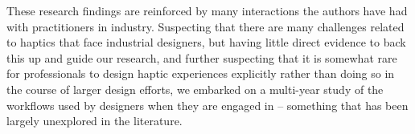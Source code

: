 These research findings are reinforced by many interactions the authors have had with practitioners in industry.
Suspecting that there are many challenges related to haptics that face industrial designers, but having little direct evidence to back this up and guide our research,
and further suspecting that it is somewhat rare for professionals to design haptic experiences explicitly rather than doing so in the course of larger design efforts,
we embarked on a multi-year study of the workflows used by designers when they are engaged in \haxd{} -- something that has been largely unexplored in the literature.
%

